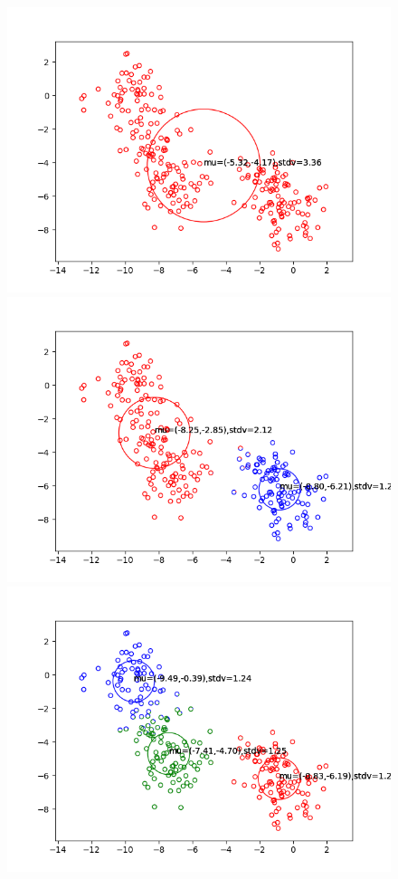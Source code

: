 \documentclass[letterpaper, 12pt]{article}
\begin{document}
\begin{figure}[h!]
    \includegraphics[scale=0.48]{14k1}
    \includegraphics[scale=0.48]{14k2}
    \includegraphics[scale=0.48]{14k3}

\end{figure}
\end{document}
